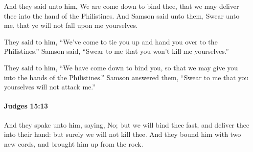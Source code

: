 			\begin{versebox}
					\item[BHS] 
					\item[ASV] And they said unto him, We are come down to bind thee, that we may deliver thee into the hand of the Philistines. And Samson said unto them, Swear unto me, that ye will not fall upon me yourselves.
					\item[NIV] They said to him, “We’ve come to tie you up and hand you over to the Philistines.” Samson said, “Swear to me that you won’t kill me yourselves.”
					\item[NRSV] They said to him, “We have come down to bind you, so that we may give you into the hands of the Philistines.” Samson answered them, “Swear to me that you yourselves will not attack me.”
			\end{versebox}

		\paragraph{Judges 15:13} %
			\label{JUDGES-15-13}

			And they spake unto him, saying, No; but we will bind thee fast, and deliver thee into their hand: but surely we will not kill thee. And they bound him with two new cords, and brought him up from the rock.

